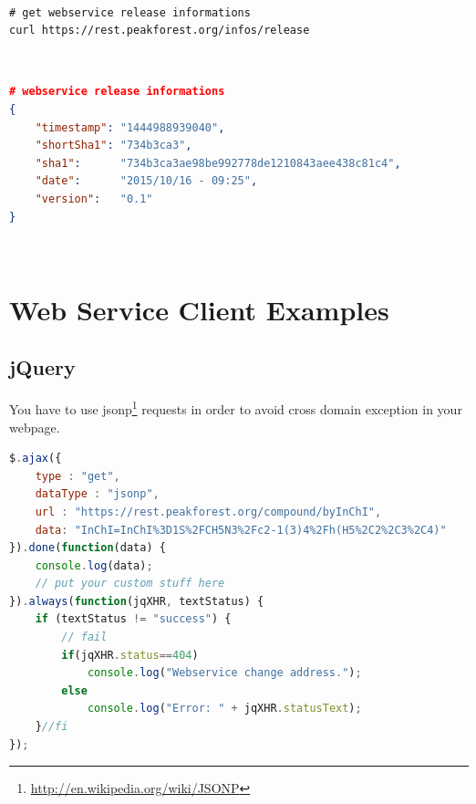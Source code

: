 ~\\
\begin{lstlisting}[language=custombash,caption={Get webservice release informations Demo},label=releaseDataDemo]
# get webservice release informations 
curl https://rest.peakforest.org/infos/release
\end{lstlisting}
~\\
\begin{lstlisting}[language=json,caption={Webservice release informations JSON structure},label=releaseDataResult]
# webservice release informations 
{
	"timestamp": "1444988939040",
	"shortSha1": "734b3ca3",
	"sha1":      "734b3ca3ae98be992778de1210843aee438c81c4",
	"date":      "2015/10/16 - 09:25",
	"version":   "0.1"
}
\end{lstlisting}
~\\


%
%

\section{Web Service Client Examples}

\subsection{jQuery}
\hspace*{\parindent}
You have to use jsonp\footnote{\url{http://en.wikipedia.org/wiki/JSONP}} requests in order to avoid cross domain exception in your webpage. 
\begin{lstlisting}[language=JavaScript,caption={Javascript / jQuery request}]
$.ajax({
	type : "get",
	dataType : "jsonp",
	url : "https://rest.peakforest.org/compound/byInChI",
	data: "InChI=InChI%3D1S%2FCH5N3%2Fc2-1(3)4%2Fh(H5%2C2%2C3%2C4)"
}).done(function(data) {
	console.log(data);
	// put your custom stuff here 
}).always(function(jqXHR, textStatus) {
	if (textStatus != "success") {
		// fail
		if(jqXHR.status==404)
			console.log("Webservice change address.");
		else
			console.log("Error: " + jqXHR.statusText);
	}//fi
});
\end{lstlisting}

